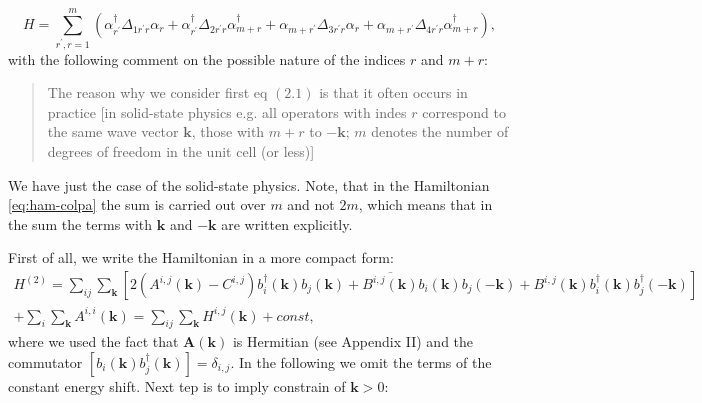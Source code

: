 \documentclass[a4paper,12pt]{article}
\begin{document}
            \begin{equation}
                H = \sum_{r^{\prime}, r = 1}^m \left(\alpha_{r^{\prime}}^{\dag}\Delta_{1r^{\prime}r}\alpha_r +
                \alpha_{r^{\prime}}^{\dag}\Delta_{2r^{\prime}r}\alpha_{m+r}^{\dag} +
                \alpha_{m + r^{\prime}}\Delta_{3r^{\prime}r}\alpha_r +
                \alpha_{m + r^{\prime}}\Delta_{4r^{\prime}r}\alpha_{m + r}^{\dag}\right), \label{eq:ham-colpa}
            \end{equation}
            with the following comment on the possible nature of the indices $r$ and $m+r$:
            \begin{quote}
                The reason why we consider first eq $(2.1)$ is that it often occurs in practice 
                [in solid-state physics e.g. all operators with indes $r$ correspond to the same wave vector $\boldsymbol{k}$, 
                those with $m+r$ to $-\boldsymbol{k}$; $m$ denotes the number of degrees of freedom in the unit cell (or less)] 
            \end{quote}

            We have just the case of the solid-state physics. Note, that in the Hamiltonian \eqref{eq:ham-colpa} the sum is carried out over $m$ and not $2m$, 
            which means that in the sum the terms with $\boldsymbol{k}$ and $-\boldsymbol{k}$ are written explicitly. 

            First of all, we write the Hamiltonian in a more compact form:
            \begin{multline}
                H^{(2)} = \sum_{ij}\sum_{\boldsymbol{k}}\left[2(A^{i,j}(\boldsymbol{k}) - C^{i,j})b^{\dag}_{i}(\boldsymbol{k})b_{j}(\boldsymbol{k}) + 
                \overline{B^{i,j}(\boldsymbol{k})}b_{i}(\boldsymbol{k})b_{j}(-\boldsymbol{k}) +
                B^{i,j}(\boldsymbol{k})b^{\dag}_{i}(\boldsymbol{k})b^{\dag}_{j}(-\boldsymbol{k})\right]\\
                +\sum_i \sum_{\boldsymbol{k}} A^{i,i}(\boldsymbol{k}) 
                = \sum_{ij}\sum_{\boldsymbol{k}} H^{i,j}(\boldsymbol{k}) 
                + const, \label{eq:ham-simple}
            \end{multline}
            where we used the fact that $\boldsymbol{A}(\boldsymbol{k})$ is Hermitian (see Appendix II) and the commutator $[b_{i}(\boldsymbol{k})b^{\dag}_{j}(\boldsymbol{k})] = \delta_{i,j}$. 
            In the following we omit the terms of the constant energy shift. Next tep is to imply constrain of $\boldsymbol{k}>0$:
\end{document}
